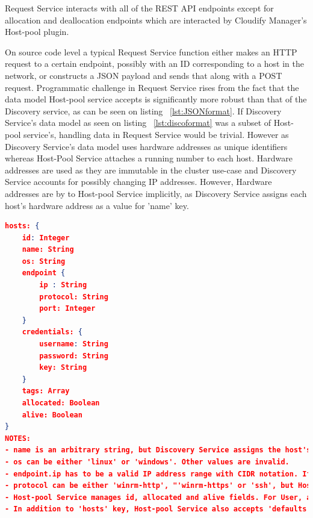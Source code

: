 Request Service interacts with all of the REST API endpoints except for allocation and deallocation endpoints which are interacted by Cloudify Manager's Host-pool plugin.

On source code level a typical Request Service function either makes an HTTP request to a certain endpoint, possibly with an ID corresponding to a host in the network, or constructs a JSON payload and sends that along with a POST request. Programmatic challenge in Request Service rises from the fact that the data model Host-pool service accepts is significantly more robust than that of the Discovery service, as can be seen on listing ~\ref{lst:JSONformat}. If Discovery Service's data model as seen on listing ~\ref{lst:discoformat} was a subset of Host-pool service's, handling data in Request Service would be trivial. However as Discovery Service's data model uses hardware addresses as unique identifiers whereas Host-Pool Service attaches a running number to each host. Hardware addresses are used as they are immutable in the cluster use-case and Discovery Service accounts for possibly changing IP addresses. However, Hardware addresses are by to Host-pool Service implicitly, as Discovery Service assigns each host's hardware address as a value for 'name' key. \pagebreak

\begin{lstlisting}[language=json,firstnumber=1, caption={JSON schema accepted by the Host-pool Service for a single host}, captionpos=b, label=lst:JSONformat]
hosts: {
	id: Integer
	name: String
	os: String
	endpoint {
		ip : String
		protocol: String
		port: Integer	
	}
	credentials: {
		username: String
		password: String
		key: String
	}
	tags: Array
	allocated: Boolean
	alive: Boolean
}
NOTES:
- name is an arbitrary string, but Discovery Service assigns the host's hardware address as the value of name.
- os can be either 'linux' or 'windows'. Other values are invalid.
- endpoint.ip has to be a valid IP address range with CIDR notation. If a range is defined, Host-pool Service considers each unique IP address a single host.
- protocol can be either 'winrm-http', "'winrm-https' or 'ssh', but Host-pool service does not explicitly force this.
- Host-pool Service manages id, allocated and alive fields. For User, all other fields except credentials.password, credentials.key and tags are obligatory.
- In addition to 'hosts' key, Host-pool Service also accepts 'defaults' key. 'defaults' can contain the same keys as 'hosts'. If 'defaults' is provided, its values are appended to each host which has respective undefined values. id, allocated and alive cannot be provided as defaults.

\end{lstlisting}

